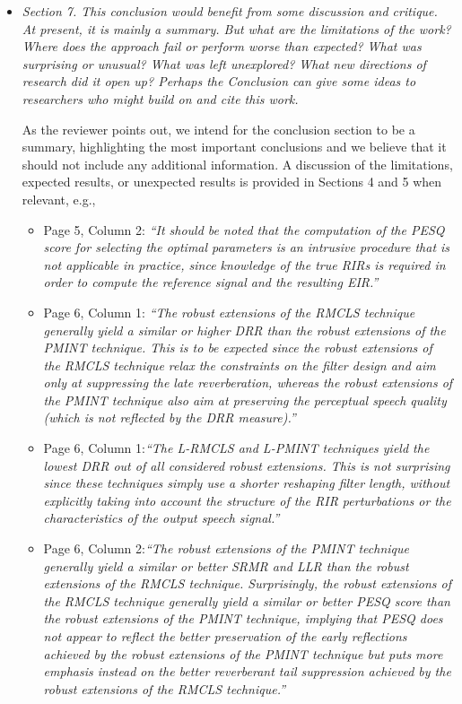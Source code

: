 \documentclass[10pt, a4paper]{article}
\begin{document}
\begin{itemize}
\item {\textit{Section 7. This conclusion would benefit from some discussion and critique. At present, it is mainly a summary. But what are the limitations of the work? Where does the approach fail or perform worse than expected? What was surprising or unusual? What was left unexplored? What new directions of research did it open up? Perhaps the Conclusion can give some ideas to researchers who might build on and cite this work.}}

As the reviewer points out, we intend for the conclusion section to be a summary, highlighting the most important conclusions and we believe that it should not include any additional information.
A discussion of the limitations, expected results, or unexpected results is provided in Sections 4 and 5 when relevant, e.g.,

\begin{itemize}
\item {Page 5, Column 2: \emph{``It should be noted that the computation of the PESQ score for selecting the optimal parameters is an intrusive procedure that is not applicable in practice, since knowledge of the true RIRs is required in order to compute the reference signal and the resulting EIR.''}}
\item {Page 6, Column 1: \emph{``The robust extensions of the RMCLS technique generally yield a similar or higher DRR than the robust extensions of the PMINT technique.
This is to be expected since the robust extensions of the RMCLS technique relax the constraints on the filter design and aim only at suppressing the late reverberation, whereas the robust extensions of the PMINT technique also aim at preserving the perceptual speech quality (which is not reflected by the DRR measure).''}}
\item {Page 6, Column 1:\emph{``The L-RMCLS and L-PMINT techniques yield the lowest DRR out of all considered robust extensions. 
This is not surprising since these techniques simply use a shorter reshaping filter length, without explicitly taking into account the structure of the RIR perturbations or the characteristics of the output speech signal.''}}
\item {Page 6, Column 2:\emph{``The robust extensions of the PMINT technique generally yield a similar or better SRMR and LLR than the robust extensions of the RMCLS technique. Surprisingly, the robust extensions of the RMCLS technique generally yield a similar or better PESQ score than the robust extensions of the PMINT technique, implying that PESQ does not appear to reflect the better preservation of the early reflections achieved by the robust extensions of the PMINT technique but puts more emphasis instead on the better reverberant tail suppression achieved by the robust extensions of the RMCLS technique.''}}
\end{itemize} 


\end{itemize}
\end{document}
